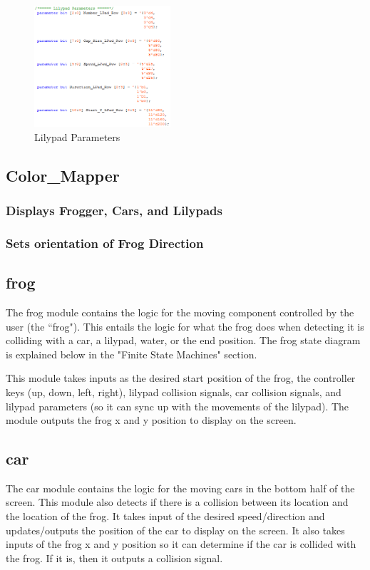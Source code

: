 \documentclass[journal, twocolumn, final,11pt,letterpaper]{IEEEtran}
\begin{document}
	\begin{figure}[H]
		\centering
		\includegraphics[width=0.45\textwidth]{lilypad_parameters.png}
		\caption{Lilypad Parameters}
		\label{fig:lilypad-parameters]}
	\end{figure}
	
	\subsection{Color\_Mapper}
		\subsubsection{Displays Frogger, Cars, and Lilypads }
		\subsubsection{Sets orientation of Frog Direction}
	\subsection{frog}
	The frog module contains the logic for the moving component controlled by the user (the ``frog"). This entails the logic for what the frog does when detecting it is colliding with a car, a lilypad, water, or the end position. The frog state diagram is explained below in the "Finite State Machines" section. 
	
	This module takes inputs as the desired start position of the frog, the controller keys (up, down, left, right), lilypad collision signals, car collision signals, and lilypad parameters (so it can sync up with the movements of the lilypad). The module outputs the frog x and y position to display on the screen.
	
	\subsection{car}
	The car module contains the logic for the moving cars in the bottom half of the screen. This module also detects if there is a collision between its location and the location of the frog. It takes input of the desired speed/direction and updates/outputs the position of the car to display on the screen. It also takes inputs of the frog x and y position so it can determine if the car is collided with the frog. If it is, then it outputs a collision signal.
	
\end{document}
